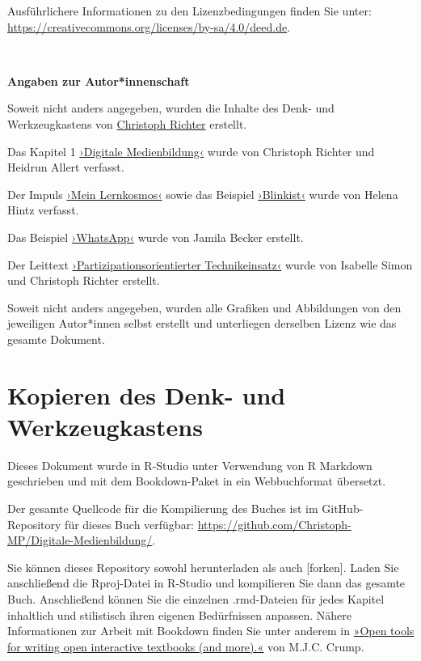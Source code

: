 \documentclass[
  a4paper,
]{book}
\begin{document}
Ausführlichere Informationen zu den Lizenzbedingungen finden Sie unter: \url{https://creativecommons.org/licenses/by-sa/4.0/deed.de}.

~

\textbf{Angaben zur Autor*innenschaft}

Soweit nicht anders angegeben, wurden die Inhalte des Denk- und Werkzeugkastens von \href{Mailto:richter@paedagogik.uni-kiel.de}{Christoph Richter} erstellt.

Das Kapitel 1 \hyperref[digitale-medienbildung]{›Digitale Medienbildung‹} wurde von Christoph Richter und Heidrun Allert verfasst.

Der Impuls \hyperref[mein-lernkosmos]{›Mein Lernkosmos‹} sowie das Beispiel \hyperref[beispiel-blinkist]{›Blinkist‹} wurde von Helena Hintz verfasst.

Das Beispiel \hyperref[beispiel-whatsapp]{›WhatsApp‹} wurde von Jamila Becker erstellt.

Der Leittext \hyperref[partizipationsorientierter-technikeinsatz]{›Partizipationsorientierter Technikeinsatz‹} wurde von Isabelle Simon und Christoph Richter erstellt.

Soweit nicht anders angegeben, wurden alle Grafiken und Abbildungen von den jeweiligen Autor*innen selbst erstellt und unterliegen derselben Lizenz wie das gesamte Dokument.

\section{Kopieren des Denk- und Werkzeugkastens}\label{kopieren-des-denk--und-werkzeugkastens}

Dieses Dokument wurde in R-Studio unter Verwendung von R Markdown geschrieben und mit dem Bookdown-Paket in ein Webbuchformat übersetzt.

Der gesamte Quellcode für die Kompilierung des Buches ist im GitHub-Repository für dieses Buch verfügbar: \url{https://github.com/Christoph-MP/Digitale-Medienbildung/}.

Sie können dieses Repository sowohl herunterladen als auch {[}forken{]}. Laden Sie anschließend die Rproj-Datei in R-Studio und kompilieren Sie dann das gesamte Buch. Anschließend können Sie die einzelnen .rmd-Dateien für jedes Kapitel inhaltlich und stilistisch ihren eigenen Bedürfnissen anpassen. Nähere Informationen zur Arbeit mit Bookdown finden Sie unter anderem in \href{https://www.crumplab.com/OER_bookdown/}{»Open tools for writing open interactive textbooks (and more).«} von M.J.C. Crump.
\end{document}
